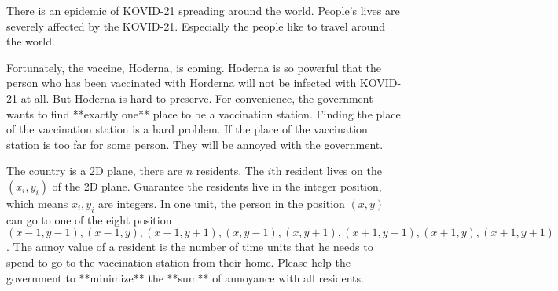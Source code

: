 There is an epidemic of KOVID-21 spreading around the world.
People's lives are severely affected by the KOVID-21. 
Especially the people like to travel around the world.

Fortunately, the vaccine, Hoderna, is coming.
Hoderna is so powerful that the person who has been vaccinated with Horderna will not be infected with KOVID-21 at all.
But Hoderna is hard to preserve. 
For convenience, the government wants to find **exactly one** place to be a vaccination station.
Finding the place of the vaccination station is a hard problem.
If the place of the vaccination station is too far for some person. 
They will be annoyed with the government.

The country is a 2D plane, there are $n$ residents.
The $i$th resident lives on the $(x_i,y_i)$ of the 2D plane.
Guarantee the residents live in the integer position, which means $x_i,y_i$ are integers.
In one unit, the person in the position $(x,y)$ can go to one of the eight position
$(x-1,y-1),(x-1,y),(x-1,y+1),(x,y-1),(x,y+1),(x+1,y-1),(x+1,y),(x+1,y+1)$.
The annoy value of a resident is the number of time units that he needs to spend to go to the vaccination station from their home.
Please help the government to **minimize** the **sum** of annoyance with all residents.

